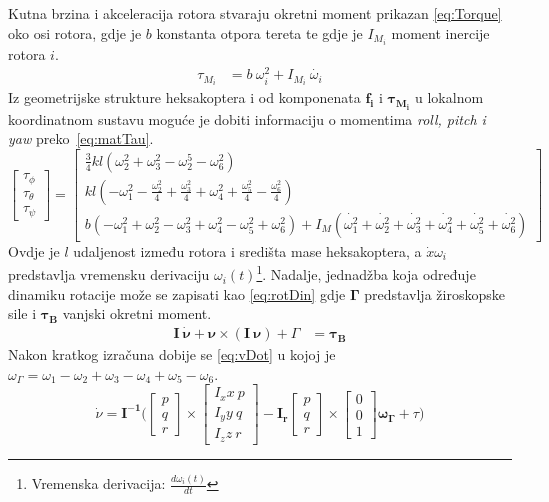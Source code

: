 \documentclass[times, utf8, diplomski]{fer}
\begin{document}
Kutna brzina i akceleracija rotora stvaraju okretni moment prikazan \ref{eq:Torque} oko osi rotora, gdje je $b$ konstanta otpora tereta te gdje je $I_{M_i}$ moment inercije rotora $i$.
\begin{align}
\tau_{M_i}&=b~\omega^2_i+I_{M_i}~\dot{\omega_i} \label{eq:Torque}
\end{align}
Iz geometrijske strukture heksakoptera i od komponenata $\mathbf{f_i}$ i $\mathbf{\tau_{M_i}}$ u lokalnom koordinatnom sustavu moguće je dobiti informaciju o momentima \emph{roll, pitch i yaw} preko~\ref{eq:matTau}.
\begin{equation}
	\begin{bmatrix}
	\tau_{\phi} \\
	\tau_{\theta} \\
	\tau_{\psi}
	\end{bmatrix}
	=
	\begin{bmatrix}
	\frac{3}{4}kl(\omega^2_2+\omega^2_3-\omega^5_2-\omega^2_6) \\
	kl(-\omega^2_1-\frac{\omega^2_2}{4}+\frac{\omega^2_3}{4}+\omega^2_4+\frac{\omega^2_5}{4}-\frac{\omega^2_6}{4}) \\
	b(-\omega^2_1+\omega^2_2-\omega^2_3+\omega^2_4-\omega^2_5+\omega^2_6)+I_M(\dot{\omega^2_1}+\dot{\omega^2_2}+\dot{\omega^2_3}+\dot{\omega^2_4}+\dot{\omega^2_5}+\dot{\omega^2_6})
	\end{bmatrix}
	\label{eq:matTau}
\end{equation}
Ovdje je $l$ udaljenost između rotora i središta mase heksakoptera, a $\dot{x}\omega_i$ predstavlja vremensku derivaciju $\omega_i(t)$\footnote{Vremenska derivacija: $\frac{d\omega_i(t)}{dt}$}. Nadalje, jednadžba koja određuje dinamiku rotacije može se zapisati kao \ref{eq:rotDin} gdje $\mathbf{\Gamma}$ predstavlja žiroskopske sile i $\mathbf{\tau_B}$ vanjski okretni moment.
\begin{align}
\mathbf{I~\dot{\nu}+\nu\times(I~\nu)}+\Gamma&=\mathbf{\tau_B} \label{eq:rotDin}
\end{align}
Nakon kratkog izračuna dobije se \ref{eq:vDot} u kojoj je $\omega_{\Gamma}=\omega_1-\omega_2+\omega_3-\omega_4+\omega_5-\omega_6$.
\begin{equation}
	\dot{\nu} = \mathbf{I^{-1}} \Bigg(
	\begin{bmatrix}
	p \\
	q \\
	r
	\end{bmatrix}
	\times
	\begin{bmatrix}
	I_xx~p \\
	I_yy~q \\
	I_zz~r
	\end{bmatrix}
	-\mathbf{I_r}
	\begin{bmatrix}
	p \\
	q \\
	r
	\end{bmatrix}
	\times
	\begin{bmatrix}
	0 \\
	0 \\
	1
	\end{bmatrix}
	\mathbf{\omega_{\Gamma}}+\tau
	\Bigg)
	\label{eq:vDot}
\end{equation}
\end{document}
